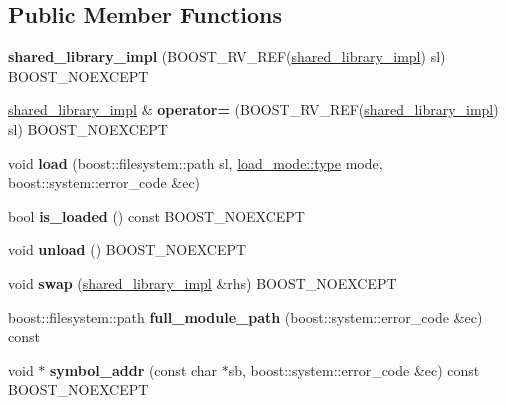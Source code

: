 \subsection*{Public Member Functions}
\begin{DoxyCompactItemize}
\item 
\mbox{\label{a01624_a45d5bb26fa73a9639618bab3e343f114}} 
{\bfseries shared\+\_\+library\+\_\+impl} (B\+O\+O\+S\+T\+\_\+\+R\+V\+\_\+\+R\+EF(\hyperlink{a01624}{shared\+\_\+library\+\_\+impl}) sl) B\+O\+O\+S\+T\+\_\+\+N\+O\+E\+X\+C\+E\+PT
\item 
\mbox{\label{a01624_a4516d0b76678a60333cb5ccbf7cc52c2}} 
\hyperlink{a01624}{shared\+\_\+library\+\_\+impl} \& {\bfseries operator=} (B\+O\+O\+S\+T\+\_\+\+R\+V\+\_\+\+R\+EF(\hyperlink{a01624}{shared\+\_\+library\+\_\+impl}) sl) B\+O\+O\+S\+T\+\_\+\+N\+O\+E\+X\+C\+E\+PT
\item 
\mbox{\label{a01624_a2c3bbcf10638f5fdeb13b1f194431ac5}} 
void {\bfseries load} (boost\+::filesystem\+::path sl, \hyperlink{a00272_a1918a602801479bc0bade54ff5665129}{load\+\_\+mode\+::type} mode, boost\+::system\+::error\+\_\+code \&ec)
\item 
\mbox{\label{a01624_a3729718e9c72b30a85087a89b642becb}} 
bool {\bfseries is\+\_\+loaded} () const B\+O\+O\+S\+T\+\_\+\+N\+O\+E\+X\+C\+E\+PT
\item 
\mbox{\label{a01624_a78b3736f4aab0a61fd07a45eb5a54c52}} 
void {\bfseries unload} () B\+O\+O\+S\+T\+\_\+\+N\+O\+E\+X\+C\+E\+PT
\item 
\mbox{\label{a01624_a7d87e32878fd68cd3c59531c5b6dcaf1}} 
void {\bfseries swap} (\hyperlink{a01624}{shared\+\_\+library\+\_\+impl} \&rhs) B\+O\+O\+S\+T\+\_\+\+N\+O\+E\+X\+C\+E\+PT
\item 
\mbox{\label{a01624_afefd81d306682e1e540bdaddbd58c8b3}} 
boost\+::filesystem\+::path {\bfseries full\+\_\+module\+\_\+path} (boost\+::system\+::error\+\_\+code \&ec) const
\item 
\mbox{\label{a01624_a79bc56fc8e9c4fb98993893b491986a8}} 
void $\ast$ {\bfseries symbol\+\_\+addr} (const char $\ast$sb, boost\+::system\+::error\+\_\+code \&ec) const B\+O\+O\+S\+T\+\_\+\+N\+O\+E\+X\+C\+E\+PT

\end{DoxyCompactItemize}
